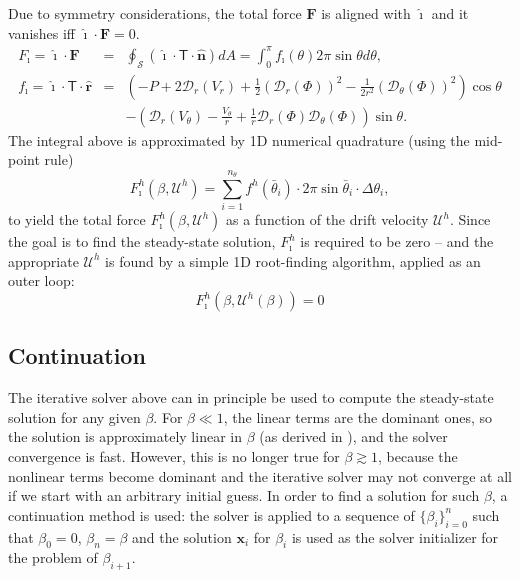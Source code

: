 \documentclass[MSc,beforeExam]{iitcsthesis}
\newcommand{\pars}[1]{\left(#1\right)}
\newcommand\bF{\boldsymbol{F}}
\newcommand\bx{\boldsymbol{x}}
\newcommand\br{\boldsymbol{r}}
\newcommand\brhat{\hat{\br}}
\newcommand\bnhat{\hat{\boldsymbol{n}}}
\newcommand\cD{\mathcal{D}}
\newcommand\cU{\mathscr{U}}
\newcommand\tT{\mathsf{T}}
\newcommand\ui{\boldsymbol{\hat{\imath}}}
\begin{document}
Due to symmetry considerations, the total force $\bF$ is 
aligned with $\ui$ and it vanishes iff $\ui \cdot \bF = 0$.
\begin{eqnarray} \nonumber
F_\imath = \ui \cdot \bF &=& 
\oint_\mathcal{S} \pars{\ui \cdot \tT \cdot \bnhat} dA = 
\int_0^\pi f_\imath(\theta) 2\pi \sin\theta d\theta ,
\\  
f_\imath = \ui \cdot \tT \cdot \brhat &=& \pars{-P + 2\cD_r(V_r) + 
\frac{1}{2}\pars{\cD_r(\varPhi)}^2 - \frac{1}{2r^2}\pars{\cD_\theta(\varPhi)}^2}\cos\theta 
\\  \nonumber
&& -\pars{\cD_r(V_\theta) - \frac{V_\theta}{r}
+ \frac{1}{r}\cD_r(\varPhi) \cD_{\theta}(\varPhi)}\sin\theta.
\end{eqnarray}
The integral above is approximated by 1D numerical quadrature
(using the mid-point rule)
\begin{equation}
F_\imath^h(\beta, \cU^h) = \sum_{i=1}^{n_\theta} f^h(\bar\theta_i) \cdot 
              2 \pi \sin\bar\theta_i \cdot \Delta\theta_i,
\end{equation}
to yield the total force $F_\imath^h(\beta, \cU^h)$ as a function of the drift velocity $\cU^h$.
Since the goal is to find the steady-state solution, $F_\imath^h$ 
is required to be zero --
and the appropriate $\cU^h$ is found by a simple 1D root-finding algorithm,
applied as an outer loop:
\begin{equation} \label{eq:disc_zero_force}
F_\imath^h(\beta, \cU^h(\beta)) = 0
\end{equation}

\subsection{Continuation}

The iterative solver above can in principle be used 
to compute the steady-state solution for any given $\beta$.
For $\beta \ll 1$, the linear terms are the dominant ones, 
so the solution is approximately linear in $\beta$ 
(as derived in \cite{yariv2010migration}), and the solver convergence is fast.
However, this is no longer true for $\beta \gtrsim 1$, because the nonlinear terms become dominant
and the iterative solver may not converge at all if we start with an arbitrary initial guess.
In order to find a solution for such $\beta$, a continuation method is used:
the solver is applied to a sequence of $\{\beta_i\}_{i=0}^n$ such that $\beta_0 = 0$,
$\beta_n = \beta$ and the solution $\bx_i$ for $\beta_i$ is used as the solver initializer
for the problem of $\beta_{i+1}$.
\end{document}
